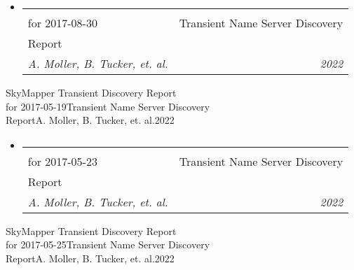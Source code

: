 \documentclass[letterpaper,11pt]{article}
\makeatletter
\newcommand{\resumeItem}[1]{
  \item\small{
    {#1 \vspace{-2pt}}
  }
}
\newcommand{\resumeSubheading}[4]{
  \vspace{-2pt}\item
    \begin{tabular*}{0.97\textwidth}[t]{l@{\extracolsep{\fill}}r}
      \textbf{#1} & #2 \\
      \textit{\small#3} & \textit{\small #4} \\
    \end{tabular*}\vspace{-7pt}
}
\newcommand{\resumeSubHeadingListStart}{\begin{itemize}[leftmargin=0.15in, label={}]}
\newcommand{\resumeSubHeadingListEnd}{\end{itemize}}
\newcommand{\resumeItemListStart}{\begin{itemize}}
\newcommand{\resumeItemListEnd}{\end{itemize}\vspace{-5pt}}
\newcommand{\publicationElement}[5]{%
    \resumeSubHeadingListStart
        \resumeSubheading
            {#1}
            {#2}
            {#3}
            {#4}
            \ifthenelse{\isempty{#5}}{}{%
                \resumeItemListStart
                    \renewcommand*{\do}[1]{\resumeItem{##1}}
                    \docsvlist{#5}%
                \resumeItemListEnd
            }%
    \resumeSubHeadingListEnd
}
\makeatother
\begin{document}
        \publicationElement{SkyMapper Transient Discovery Report\\for 2017-08-30}{Transient Name Server Discovery\\Report}{A. Moller, B. Tucker, et. al.}{2022}
        \publicationElement{SkyMapper Transient Discovery Report\\for 2017-05-19}{Transient Name Server Discovery\\Report}{A. Moller, B. Tucker, et. al.}{2022}
        \publicationElement{SkyMapper Transient Discovery Report\\for 2017-05-23}{Transient Name Server Discovery\\Report}{A. Moller, B. Tucker, et. al.}{2022}
        \publicationElement{SkyMapper Transient Discovery Report\\for 2017-05-25}{Transient Name Server Discovery\\Report}{A. Moller, B. Tucker, et. al.}{2022}

\end{document}
